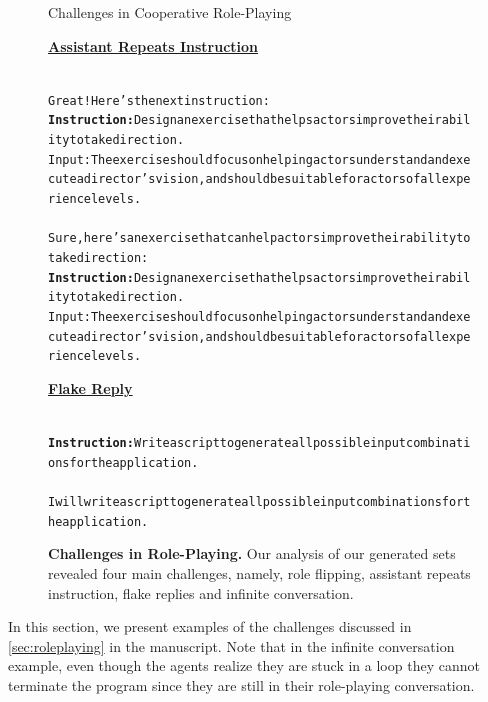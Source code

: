 \begin{figure}[h]
\begin{AIBox}{Challenges in Cooperative Role-Playing}
{\begin{alltt}
			\end{alltt}}

		\vspace{-9cm}
		\parbox[t]{0.5\textwidth}{{\bf \underline{Assistant Repeats Instruction}}\scriptsize \begin{alltt}

				\usermsg \\ Great! Here's the next instruction:\\
				\textbf{Instruction:} Design an exercise that helps actors improve their ability to take direction.\\
				Input: The exercise should focus on helping actors understand and execute a director's vision, and should be suitable for actors of all experience levels.\\

				\assistantmsg \\ Sure, here's an exercise that can help actors improve their ability to take direction:\\
				\textbf{Instruction:} Design an exercise that helps actors improve their ability to take direction.\\
				Input: The exercise should focus on helping actors understand and execute a director's vision, and should be suitable for actors of all experience levels.
			\end{alltt}}

		\parbox[t]{0.5\textwidth}{{\bf \underline{Flake Reply}}\scriptsize \begin{alltt}

				\usermsg\\
				\textbf{Instruction: }Write a script to generate all possible input combinations for the application.\\

				\assistantmsg \\ I will write a script to generate all possible input combinations for the application.
			\end{alltt}}



	\end{AIBox}
	\caption{\textbf{Challenges in Role-Playing.} Our analysis of our generated sets revealed four main challenges, namely, role flipping, assistant repeats instruction, flake replies and infinite conversation.}
	\label{fig:challenges}
\end{figure}

In this section, we present examples of the challenges discussed in \secLabel \ref{sec:roleplaying} in the manuscript. Note that in the infinite conversation example, even though the agents realize they are stuck in a loop they cannot terminate the program since they are still in their role-playing conversation.

